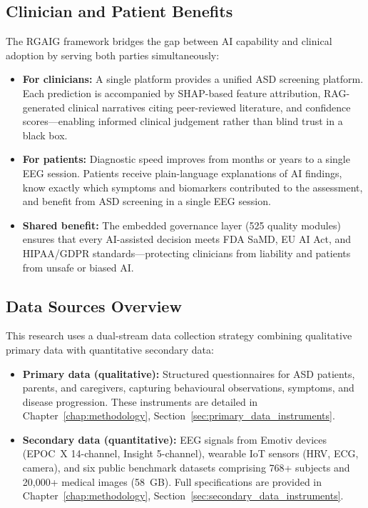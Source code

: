 \subsection{Clinician and Patient Benefits}
\label{sec:framework_helps_both}

The RGAIG framework bridges the gap between AI capability and clinical adoption by serving both parties simultaneously:

\begin{itemize}[leftmargin=*, itemsep=3pt]
    \item \textbf{For clinicians:} A single platform provides a unified ASD screening platform. Each prediction is accompanied by SHAP-based feature attribution, RAG-generated clinical narratives citing peer-reviewed literature, and confidence scores---enabling informed clinical judgement rather than blind trust in a black box.
    \item \textbf{For patients:} Diagnostic speed improves from months or years to a single EEG session. Patients receive plain-language explanations of AI findings, know exactly which symptoms and biomarkers contributed to the assessment, and benefit from ASD screening in a single EEG session.
    \item \textbf{Shared benefit:} The embedded governance layer (525 quality modules) ensures that every AI-assisted decision meets FDA SaMD, EU AI Act, and HIPAA/GDPR standards---protecting clinicians from liability and patients from unsafe or biased AI.
\end{itemize}

\subsection{Data Sources Overview}
\label{sec:data_sources_overview}

This research uses a dual-stream data collection strategy combining qualitative primary data with quantitative secondary data:

\begin{itemize}[leftmargin=*, itemsep=3pt]
    \item \textbf{Primary data (qualitative):} Structured questionnaires for ASD patients, parents, and caregivers, capturing behavioural observations, symptoms, and disease progression. These instruments are detailed in Chapter~\ref{chap:methodology}, Section~\ref{sec:primary_data_instruments}.
    \item \textbf{Secondary data (quantitative):} EEG signals from Emotiv devices (EPOC~X 14-channel, Insight 5-channel), wearable IoT sensors (HRV, ECG, camera), and six public benchmark datasets comprising 768+ subjects and 20,000+ medical images (58~GB). Full specifications are provided in Chapter~\ref{chap:methodology}, Section~\ref{sec:secondary_data_instruments}.
\end{itemize}


